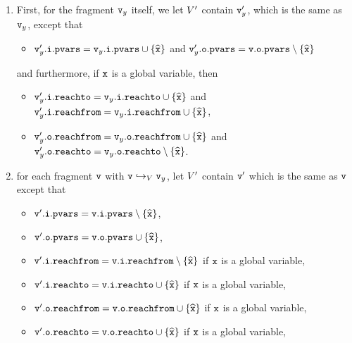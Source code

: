 \begin{enumerate}
\item
First, for the fragment $\mathtt{v}_y$ itself, we let $V'$ contain
$\mathtt{v}_y'$, which is the same as $\mathtt{v}_y$, except that
\begin{itemize}
\item $\mathtt{v}_y'.\mathtt{i}.\mathtt{pvars} = \mathtt{v}_y.\mathtt{i}.\mathtt{pvars} \cup \left\{\widehat{\mathtt{x}}\right\}$ and
  $\mathtt{v}_y'.\mathtt{o}.\mathtt{pvars} = \mathtt{v}.\mathtt{o}.\mathtt{pvars} \setminus \left\{\widehat{\mathtt{x}}\right\}$
\end{itemize}
and furthermore, if $\mathtt{x}$ is a global variable, then
{\small
  \begin{itemize}
\item $\mathtt{v}_y'.\mathtt{i}.\mathtt{reachto} = \mathtt{v}_y.\mathtt{i}.\mathtt{reachto} \cup \left\{\widehat{\mathtt{x}}\right\}$ and
$\mathtt{v}_y'.\mathtt{i}.\mathtt{reachfrom} = \mathtt{v}_y.\mathtt{i}.\mathtt{reachfrom} \cup \left\{\widehat{\mathtt{x}}\right\}$,
\item $\mathtt{v}_y'.\mathtt{o}.\mathtt{reachfrom} = \mathtt{v}_y.\mathtt{o}.\mathtt{reachfrom} \cup \left\{\widehat{\mathtt{x}}\right\}$ and
$\mathtt{v}_y'.\mathtt{o}.\mathtt{reachto} = \mathtt{v}_y.\mathtt{o}.\mathtt{reachto} \setminus \left\{\widehat{\mathtt{x}}\right\}$.
\end{itemize}
}
\item  for each fragment $\mathtt{v}$ with $\mathtt{v} \hookrightarrow_{V} \mathtt{v}_y$, let $V'$ contain $\mathtt{v}'$ which is the same as $\mathtt{v}$ except that
\begin{itemize}
\item $\mathtt{v}'.\mathtt{i}.\mathtt{pvars} = \mathtt{v}.\mathtt{i}.\mathtt{pvars} \setminus \left\{\widehat{\mathtt{x}}\right\}$,
\item $\mathtt{v}'.\mathtt{o}.\mathtt{pvars} = \mathtt{v}.\mathtt{o}.\mathtt{pvars} \cup \left\{\widehat{\mathtt{x}}\right\}$,
\item $\mathtt{v}'.\mathtt{i}.\mathtt{reachfrom} = \mathtt{v}.\mathtt{i}.\mathtt{reachfrom} \setminus \left\{\widehat{\mathtt{x}}\right\}$ if $\tt x$ is a global variable,
\item $\mathtt{v}'.\mathtt{i}.\mathtt{reachto} = \mathtt{v}.\mathtt{i}.\mathtt{reachto} \cup \left\{\widehat{\mathtt{x}}\right\}$ if $\tt x$ is a global variable,
 \item $\mathtt{v}'.\mathtt{o}.\mathtt{reachfrom} = \mathtt{v}.\mathtt{o}.\mathtt{reachfrom} \cup \left\{\widehat{\mathtt{x}}\right\}$ if $\tt x$ is a global variable,
\item $\mathtt{v}'.\mathtt{o}.\mathtt{reachto} = \mathtt{v}.\mathtt{o}.\mathtt{reachto} \cup \left\{\widehat{\mathtt{x}}\right\}$ if $\tt x$ is a global variable,

\end{itemize}
\end{enumerate}

